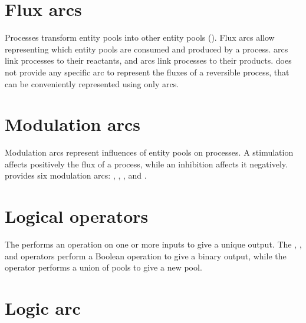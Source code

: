 \section{Flux arcs}
\label{sec:fluxes}

Processes transform entity pools into other entity pools ().
Flux arcs allow representing which entity pools are consumed and produced by a process.
 arcs link processes to their reactants, and  arcs link processes to their products.
\SBGNPDLone does not provide any specific arc to represent the fluxes of a reversible process, that can be conveniently represented using only  arcs.




\section{Modulation arcs}
\label{sec:modulations}

Modulation arcs represent influences of entity pools on processes.
A stimulation affects positively the flux of a process, while an inhibition affects it negatively.
\SBGNPDLone provides six modulation arcs: , , ,  and .







\section{Logical operators}

\label{sec:logic}

The  performs an operation on one or more inputs to give a unique output.
The , , and  operators perform a Boolean operation to give a binary output, while the  operator performs a union of pools to give a new pool.






\section{Logic arc}
\label{sec:logic_arc}



